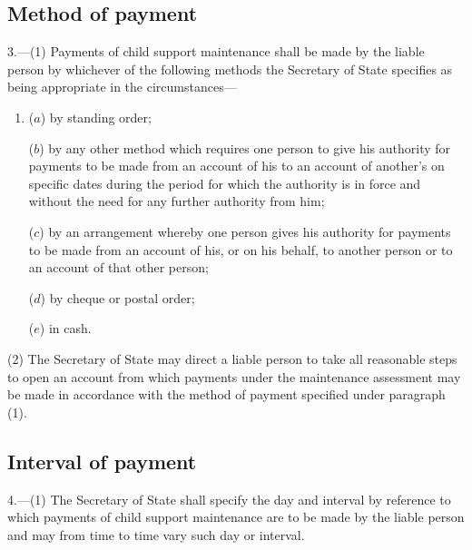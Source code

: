 \documentclass[a4paper]{article}
\begin{document}
\subsection[3. Method of payment]{Method of payment}

3.—(1) Payments of child support maintenance shall be made by the liable person by whichever of the following methods the Secretary of State specifies as being appropriate in the circumstances—
\begin{enumerate}\item[]
($a$) by standing order;

($b$) by any other method which requires one person to give his authority for payments to be made from an account of his to an account of another’s on specific dates during the period for which the authority is in force and without the need for any further authority from him;

($c$) by an arrangement whereby one person gives his authority for payments to be made from an account of his, or on his behalf, to another person or to an account of that other person;

($d$) by cheque or postal order;

($e$) in cash.
\end{enumerate}

(2) The Secretary of State may direct a liable person to take all reasonable steps to open an account from which payments under the maintenance assessment may be made in accordance with the method of payment specified under paragraph (1).

\subsection[4. Interval of payment]{Interval of payment}

4.—(1) The Secretary of State shall specify the day and interval by reference to which payments of child support maintenance are to be made by the liable person and may from time to time vary such day or interval.

%
%
\end{document}
